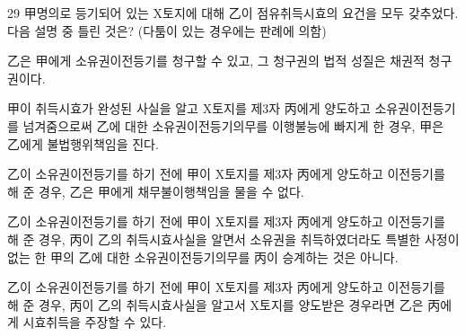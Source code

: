 \begin{question}{29}
甲명의로 등기되어 있는 X토지에 대해 乙이 점유취득시효의 요건을 모두 갖추었다. 다음 설명 중 틀린 것은? (다툼이 있는 경우에는 판례에 의함)
\begin{choices}
  \item 乙은 甲에게 소유권이전등기를 청구할 수 있고, 그 청구권의 법적 성질은 채권적 청구권이다.
  \item 甲이 취득시효가 완성된 사실을 알고 X토지를 제3자 丙에게 양도하고 소유권이전등기를 넘겨줌으로써 乙에 대한 소유권이전등기의무를 이행불능에 빠지게 한 경우, 甲은 乙에게 불법행위책임을 진다.
  \item 乙이 소유권이전등기를 하기 전에 甲이 X토지를 제3자 丙에게 양도하고 이전등기를 해 준 경우, 乙은 甲에게 채무불이행책임을 물을 수 없다.
  \item 乙이 소유권이전등기를 하기 전에 甲이 X토지를 제3자 丙에게 양도하고 이전등기를 해 준 경우, 丙이 乙의 취득시효사실을 알면서 소유권을 취득하였더라도 특별한 사정이 없는 한 甲의 乙에 대한 소유권이전등기의무를 丙이 승계하는 것은 아니다.
  \item 乙이 소유권이전등기를 하기 전에 甲이 X토지를 제3자 丙에게 양도하고 이전등기를 해 준 경우, 丙이 乙의 취득시효사실을 알고서 X토지를 양도받은 경우라면 乙은 丙에게 시효취득을 주장할 수 있다.
\end{choices}
\end{question}
